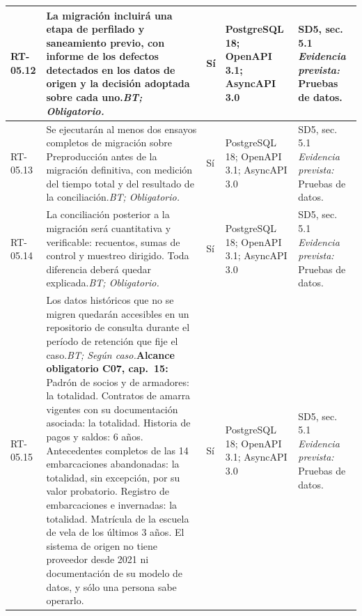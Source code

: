 \begin{paginaHorizontalSynaptix}
\begin{longtable}{|L{0.09\AnchoMatrizTDoce}|L{0.385\AnchoMatrizTDoce}|L{0.065\AnchoMatrizTDoce}|L{0.18\AnchoMatrizTDoce}|L{0.28\AnchoMatrizTDoce}|}
RT-\allowbreak{}05.\allowbreak{}12 &
La migración incluirá una etapa de perfilado y saneamiento previo, con informe de los defectos detectados en los datos de origen y la decisión adoptada sobre cada uno.\newline\textit{BT; Obligatorio.} &
Sí &
PostgreSQL 18; OpenAPI 3.1; AsyncAPI 3.0 &
SD5, sec. 5.1 \newline\textit{Evidencia prevista:} Pruebas de datos. \\ \hline

RT-\allowbreak{}05.\allowbreak{}13 &
Se ejecutarán al menos dos ensayos completos de migración sobre Preproducción antes de la migración definitiva, con medición del tiempo total y del resultado de la conciliación.\newline\textit{BT; Obligatorio.} &
Sí &
PostgreSQL 18; OpenAPI 3.1; AsyncAPI 3.0 &
SD5, sec. 5.1 \newline\textit{Evidencia prevista:} Pruebas de datos. \\ \hline

RT-\allowbreak{}05.\allowbreak{}14 &
La conciliación posterior a la migración será cuantitativa y verificable: recuentos, sumas de control y muestreo dirigido. Toda diferencia deberá quedar explicada.\newline\textit{BT; Obligatorio.} &
Sí &
PostgreSQL 18; OpenAPI 3.1; AsyncAPI 3.0 &
SD5, sec. 5.1 \newline\textit{Evidencia prevista:} Pruebas de datos. \\ \hline

RT-\allowbreak{}05.\allowbreak{}15 &
Los datos históricos que no se migren quedarán accesibles en un repositorio de consulta durante el período de retención que fije el caso.\newline\textit{BT; Según caso.}\newline\textbf{Alcance obligatorio C07, cap.~15:} Padrón de socios y de armadores: la totalidad. Contratos de amarra vigentes con su documentación asociada: la totalidad. Historia de pagos y saldos: 6 años. Antecedentes completos de las 14 embarcaciones abandonadas: la totalidad, sin excepción, por su valor probatorio. Registro de embarcaciones e invernadas: la totalidad. Matrícula de la escuela de vela de los últimos 3 años. El sistema de origen no tiene proveedor desde 2021 ni documentación de su modelo de datos, y sólo una persona sabe operarlo. &
Sí &
PostgreSQL 18; OpenAPI 3.1; AsyncAPI 3.0 &
SD5, sec. 5.1 \newline\textit{Evidencia prevista:} Pruebas de datos. \\ \hline


\end{longtable}
\end{paginaHorizontalSynaptix}
